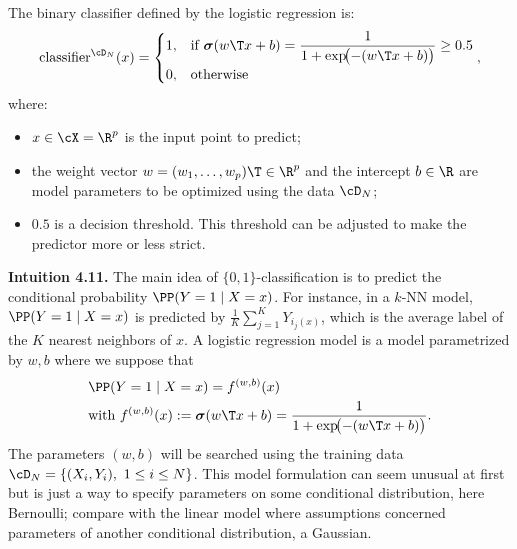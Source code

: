 The binary classifier defined by the logistic regression is:
\begin{equation}\label{eq:ch4-classifier}
\mathrm{classifier}^{\cD_N}(x) = \begin{cases} 1, & \text{if } \boldsymbol{\sigma}(w\T x + b) = \dfrac{1}{1 + \exp\!\bigl(-(w\T x + b)\bigr)} \ge 0.5 \\ 0, & \text{otherwise} \end{cases},
\end{equation}
where:
\begin{itemize}
\item $x \in \cX = \R^p$ is the input point to predict;
\item the weight vector $w = (w_1, \ldots, w_p)\T \in \R^p$ and the intercept $b \in \R$ are model parameters to be optimized using the data $\cD_N$;
\item $0.5$ is a decision threshold. This threshold can be adjusted to make the predictor more or less strict.
\end{itemize}

\begin{tcolorbox}[remarkbox]
\textbf{Intuition 4.11.} The main idea of $\{0, 1\}$-classification is to predict the
conditional probability $\PP(Y = 1 \mid X = x)$. For instance, in a $k$-NN
model, $\PP(Y = 1 \mid X = x)$ is predicted by $\frac{1}{K} \sum_{j=1}^K Y_{i_j(x)}$, which is the
average label of the $K$ nearest neighbors of $x$. A logistic regression
model is a model parametrized by $w, b$ where we suppose that
\begin{align}
&\PP(Y = 1 \mid X = x) = f^{(w,b)}(x) \label{eq:ch4-cond-prob-1}\\
&\text{with } f^{(w,b)}(x) := \boldsymbol{\sigma}(w\T x + b) = \frac{1}{1 + \exp\!\bigl(-(w\T x + b)\bigr)}. \label{eq:ch4-fwb-def}
\end{align}
The parameters $(w, b)$ will be searched using the training data $\cD_N = \{(X_i, Y_i),\ 1 \le i \le N\}$. This model formulation can seem unusual at
first but is just a way to specify parameters on some conditional distribution, here Bernoulli; compare with the linear model where assumptions
concerned parameters of another conditional distribution, a Gaussian.
\end{tcolorbox}

